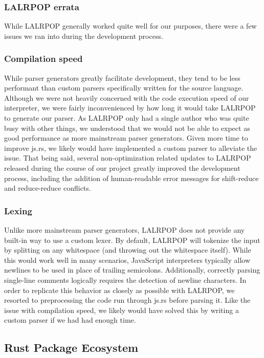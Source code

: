 \documentclass{article}
\begin{document}
\begin{multicols}{2}
\subsubsection*{LALRPOP errata}

While LALRPOP generally worked quite well for our purposes, there were a few
issues we ran into during the development process.

\subsubsection*{Compilation speed}

While parser generators greatly facilitate development, they tend to be less
performant than custom parsers specifically written for the source language.
Although we were not heavily concerned with the code execution speed of our
interpreter, we were fairly inconvenienced by how long it would take LALRPOP to
generate our parser. As LALRPOP only had a single author who was quite busy with
other things, we understood that we would not be able to expect as good
performance as more mainstream parser generators. Given more time to improve
js.rs, we likely would have implemented a custom parser to alleviate the issue.
That being said, several non-optimization related updates to LALRPOP released
during the course of our project greatly improved the development process,
including the addition of human-readable error messages for shift-reduce and
reduce-reduce conflicts.

\subsubsection*{Lexing}

Unlike more mainstream parser generators, LALRPOP does not provide any built-in
way to use a custom lexer. By default, LALRPOP will tokenize the input by
splitting on any whitespace (and throwing out the whitespace itself). While this
would work well in many scenarios, JavaScript interpreters typically allow
newlines to be used in place of trailing semicolons. Additionally, correctly
parsing single-line comments logically requires the detection of newline
characters. In order to replicate this behavior as closely as possible with
LALRPOP, we resorted to preprocessing the code run through js.rs before parsing
it. Like the issue with compilation speed, we likely would have solved this by
writing a custom parser if we had had enough time.

\subsection*{Rust Package Ecosystem}


\end{multicols}
\end{document}
